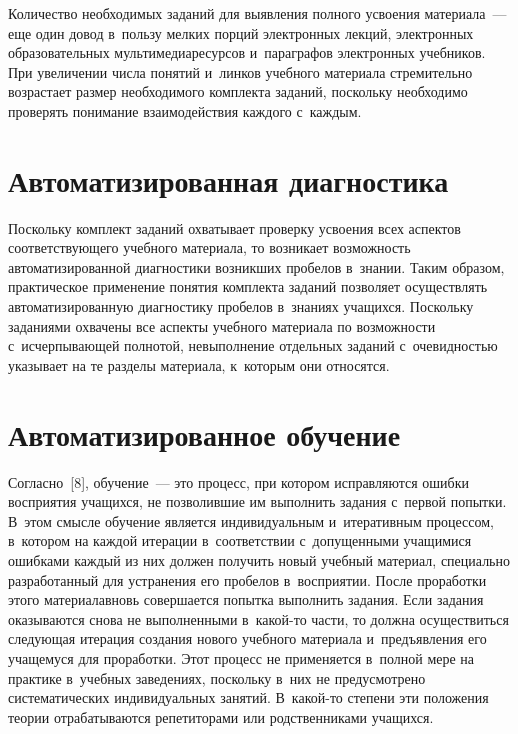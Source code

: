 \begin{multicols}{2}
  Количество необходимых заданий для выявления полного усвоения 
материала~--- еще один довод в~пользу мелких порций электронных лекций, 
электронных образовательных мультимедиаресурсов и~параграфов 
электронных учебников. При увеличении числа понятий и~линков учебного 
материала стремительно возрастает размер необходимого комплекта заданий, 
поскольку необходимо проверять понимание взаимодействия каждого 
с~каждым.
  
\section{Автоматизированная диагностика }

  Поскольку комплект заданий охватывает проверку усвоения всех аспектов 
соответствующего учебного материала, то возникает возможность 
автоматизиро\-ванной диагностики возникших пробелов в~знании. Таким 
образом, практическое применение понятия комплекта заданий позволяет 
осуществлять автоматизированную диагностику пробелов в~знаниях учащихся. 
Поскольку заданиями охвачены все аспекты учебного материала по 
возможности с~исчерпывающей полнотой, невыполнение отдельных заданий 
с~очевидностью указывает на те разделы материала, к~которым они относятся.
  
\section{Автоматизированное обучение}

  Согласно~[8], обучение~--- это процесс, при котором исправляются ошибки 
восприятия учащихся, не позволившие им выполнить задания с~первой\linebreak 
попытки. В~этом смысле обучение является индивидуальным и~итеративным 
процессом, в~котором на каждой итерации в~соответствии с~допущенными 
учащимися ошибками каждый из них должен получить новый учебный 
материал, специально разработанный для устранения его пробелов 
в~восприятии. После проработки этого материала\linebreak вновь совершается попытка 
выполнить задания. Если задания оказываются снова не выполненными  
в~ка\-кой-то части, то должна осуществиться следующая итерация создания 
нового учебного материала и~предъявления его учащемуся для проработки. 
Этот процесс не применяется в~полной мере на практике в~учебных заведениях, 
поскольку в~них не предусмотрено систематических индивидуальных занятий. 
В~ка\-кой-то степени эти положения теории отрабатываются репетиторами или 
родственниками учащихся.
  

\end{multicols}

